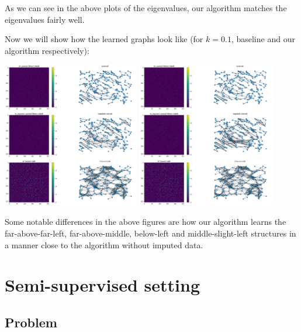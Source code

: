 \documentclass[a4paper]{article}
\begin{document}
As we can see in the above plots of the eigenvalues, our algorithm matches the eigenvalues fairly well.

Now we will show how the learned graphs look like (for $k = 0.1$, baseline and our algorithm respectively):

\begin{center}
    \includegraphics[width=0.45\textwidth]{images/10_percent_baseline_learned_graphs.png}
    \includegraphics[width=0.45\textwidth]{images/10_percent_own_learned_graphs.png}
\end{center}

Some notable differences in the above figures are how our algorithm learns the far-above-far-left, far-above-middle, below-left and middle-slight-left structures in a manner close to the algorithm without imputed data.

\newpage

\section{Semi-supervised setting}

\subsection{Problem}
\end{document}
